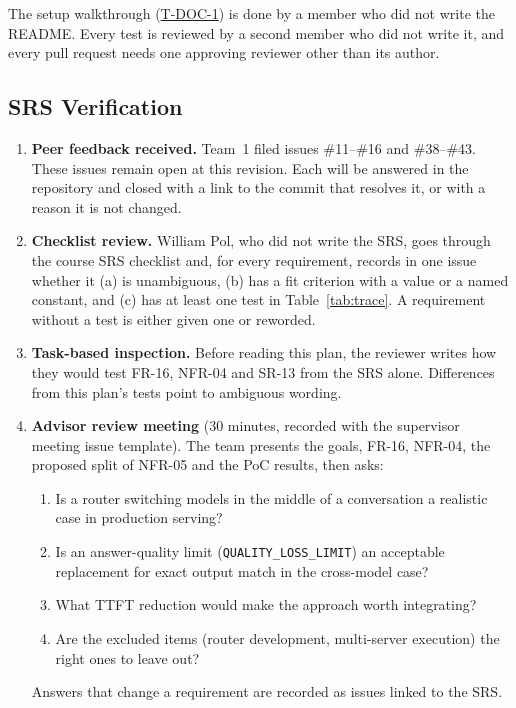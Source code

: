 \documentclass[12pt, titlepage]{article}
\newcommand{\cst}[1]{\texttt{#1}}
\newcommand{\tref}[1]{\hyperref[test:#1]{#1}}
\begin{document}
\medskip
\noindent The setup walkthrough (\tref{T-DOC-1}) is done by a member who did
not write the README. Every test is reviewed by a second member who did not write it,
and every pull request needs one approving reviewer other than its author.

\subsection{SRS Verification}
\label{sec:srsver}

\begin{enumerate}
  \item \textbf{Peer feedback received.} Team~1 filed issues \#11--\#16 and
  \#38--\#43. These issues remain open at this revision. Each will be
  answered in the repository and closed with a
  link to the commit that resolves it, or with a reason it is not
  changed.
  \item \textbf{Checklist review.} William Pol, who did not write the SRS, goes
  through the course SRS checklist and, for every requirement, records in
  one issue whether it (a) is unambiguous, (b) has a fit criterion with a
  value or a named constant, and (c) has at least one test in
  Table~\ref{tab:trace}. A requirement without a test is either given one
  or reworded.
  \item \textbf{Task-based inspection.} Before reading this plan, the
  reviewer writes how they would test FR-16, NFR-04 and SR-13 from the SRS
  alone. Differences from this plan's tests point to ambiguous wording.
  \item \textbf{Advisor review meeting} (30 minutes, recorded with the
  supervisor meeting issue template). The team presents the goals, FR-16,
  NFR-04, the proposed split of NFR-05 and the PoC results, then asks:
  \begin{enumerate}[label=(\alph*)]
    \item Is a router switching models in the middle of a conversation a
    realistic case in production serving?
    \item Is an answer-quality limit (\cst{QUALITY\_LOSS\_LIMIT}) an
    acceptable replacement for exact output match in the cross-model case?
    \item What TTFT reduction would make the approach worth integrating?
    \item Are the excluded items (router development, multi-server
    execution) the right ones to leave out?
  \end{enumerate}
  Answers that change a requirement are recorded as issues linked to the
  SRS.
\end{enumerate}
\end{document}
